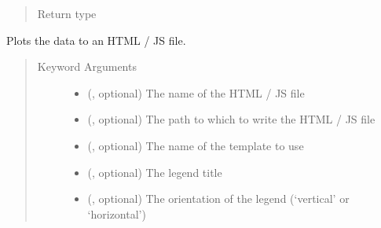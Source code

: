 \documentclass[letterpaper,10pt,english]{sphinxmanual}
\begin{document}
\begin{fulllineitems}
\begin{fulllineitems}
\begin{quote}
\begin{description}
\item[{Return type}] \leavevmode
{}

\end{description}\end{quote}

\end{fulllineitems}


\begin{fulllineitems}
\label{\detokenize{documentation:faerun.Faerun.plot}}
Plots the data to an HTML / JS file.
\begin{quote}\begin{description}
\item[{Keyword Arguments}] \leavevmode\begin{itemize}
\item {} 
 (, optional) \textendash{} The name of the HTML / JS file

\item {} 
 (, optional) \textendash{} The path to which to write the HTML / JS file

\item {} 
 (, optional) \textendash{} The name of the template to use

\item {} 
 (, optional) \textendash{} The legend title

\item {} 
 (, optional) \textendash{} The orientation of the legend (‘vertical’ or ‘horizontal’)

\end{itemize}

\end{description}\end{quote}

\end{fulllineitems}


\end{fulllineitems}
\end{document}
